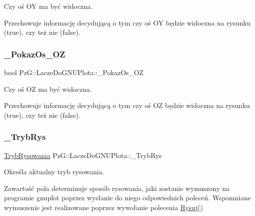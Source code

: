 Czy oś OY ma być widoczna. 

Przechowuje informację decydującą o tym czy oś OY będzie widoczna na rysunku ({\ttfamily true}), czy też nie ({\ttfamily false}). \mbox{\label{classPzG_1_1LaczeDoGNUPlota_a5b0afc06dc248790d2e7475b2162e309}} 
\subsubsection{\texorpdfstring{\+\_\+\+Pokaz\+Os\+\_\+\+OZ}{\_PokazOs\_OZ}}
{\footnotesize\ttfamily bool Pz\+G\+::\+Lacze\+Do\+G\+N\+U\+Plota\+::\+\_\+\+Pokaz\+Os\+\_\+\+OZ\hspace{0.3cm}{\ttfamily [protected]}}



Czy oś OZ ma być widoczna. 

Przechowuje informację decydującą o tym czy oś OZ będzie widoczna na rysunku ({\ttfamily true}), czy też nie ({\ttfamily false}). \mbox{\label{classPzG_1_1LaczeDoGNUPlota_a00e3a51bb47d3fb26eee875dc48215db}} 
\subsubsection{\texorpdfstring{\+\_\+\+Tryb\+Rys}{\_TrybRys}}
{\footnotesize\ttfamily \hyperlink{namespacePzG_aeedae1ef10c66d720f9e89de408ca4ca}{Tryb\+Rysowania} Pz\+G\+::\+Lacze\+Do\+G\+N\+U\+Plota\+::\+\_\+\+Tryb\+Rys\hspace{0.3cm}{\ttfamily [protected]}}



Określa aktualny tryb rysowania. 

Zawartość pola determinuje sposób rysowania, jaki zostanie wymuszony na programie {\ttfamily gnuplot} poprzez wysłanie do niego odpowiednich poleceń. Wspomniane wymuszenie jest realizowane poprzez wywołanie polecenia \hyperlink{classPzG_1_1LaczeDoGNUPlota_a065f5b8402737cc62b0ad4f66d028335}{Rysuj()} \mbox{\label{classPzG_1_1LaczeDoGNUPlota_adc3a2250216c2473a61da379da70b2d7}} 
